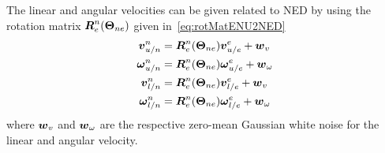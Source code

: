 The linear and angular velocities can be given related to NED by using the rotation matrix $\boldsymbol{R}_e^n(\boldsymbol{\Theta}_{ne})$ given in~\ref{eq:rotMatENU2NED}
\begin{align}
  \boldsymbol{v}^n_{u/n}&=\boldsymbol{R}_e^n(\boldsymbol{\Theta}_{ne})\boldsymbol{v}^e_{u/e}+\boldsymbol{w}_v\label{eq:uav_vel_transf}\\
  \boldsymbol{\omega}^n_{u/n}&=\boldsymbol{R}_e^n(\boldsymbol{\Theta}_{ne})\boldsymbol{\omega}^e_{u/e}+\boldsymbol{w}_{\omega}\label{eq:uav_angvel_transf}\\
  \boldsymbol{v}^n_{l/n}&=\boldsymbol{R}_e^n(\boldsymbol{\Theta}_{ne})\boldsymbol{v}^e_{l/e}+\boldsymbol{w}_v\label{eq:lp_vel_transf}\\
  \boldsymbol{\omega}^n_{l/n}&=\boldsymbol{R}_e^n(\boldsymbol{\Theta}_{ne})\boldsymbol{\omega}^e_{l/e}+\boldsymbol{w}_{\omega}\label{eq:lp_angvel_transf}
\end{align}
where $\boldsymbol{w}_v$ and $\boldsymbol{w}_{\omega}$ are the respective zero-mean Gaussian white noise for the linear and angular velocity.












